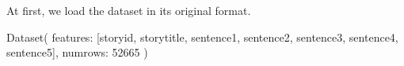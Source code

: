 \documentclass[letterpaper,10pt,english]{jupyterBook}
\begin{document}
\sphinxAtStartPar
At first, we load the dataset in its original format.
\begin{sphinxVerbatimInput}

\begin{sphinxVerbatim}[commandchars=\\\{\}]
  
\end{sphinxVerbatim}
\end{sphinxVerbatimInput}
\begin{sphinxVerbatimOutput}

\begin{sphinxVerbatim}[commandchars=\\\{\}]
Dataset(\PYGZob{}
    features: [\PYGZsq{}storyid\PYGZsq{}, \PYGZsq{}storytitle\PYGZsq{}, \PYGZsq{}sentence1\PYGZsq{}, \PYGZsq{}sentence2\PYGZsq{}, \PYGZsq{}sentence3\PYGZsq{}, \PYGZsq{}sentence4\PYGZsq{}, \PYGZsq{}sentence5\PYGZsq{}],
    num\PYGZus{}rows: 52665
\PYGZcb{})
\end{sphinxVerbatim}
\end{sphinxVerbatimOutput}
\end{document}
